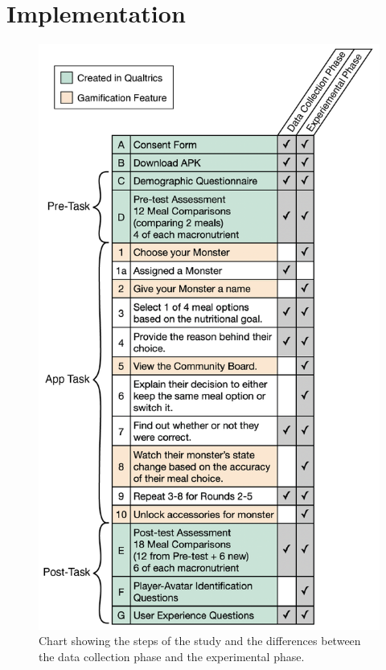 \section{Implementation}

\begin{figure}
\includegraphics[width=\linewidth]{samples/images/figure-2-02.png}
\caption{Chart showing the steps of the study and the differences between the data collection phase and the experimental phase.}
\label{fig:phasechart}
\end{figure}

